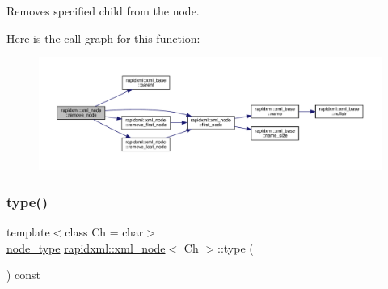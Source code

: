 Removes specified child from the node. 

Here is the call graph for this function\+:\nopagebreak
\begin{figure}[H]
\begin{center}
\leavevmode
\includegraphics[width=350pt]{classrapidxml_1_1xml__node_a98289923eb9e8889418a9eb0207ea35c_cgraph}
\end{center}
\end{figure}
\mbox{\label{classrapidxml_1_1xml__node_a5f91729128856b0aaab598d4364ace60}} 
\subsubsection{\texorpdfstring{type()}{type()}\hspace{0.1cm}{\footnotesize\ttfamily [1/2]}}
{\footnotesize\ttfamily template$<$class Ch = char$>$ \\
\mbox{\hyperlink{namespacerapidxml_abb456db38f7efb746c4330eed6072a7c}{node\+\_\+type}} \mbox{\hyperlink{classrapidxml_1_1xml__node}{rapidxml\+::xml\+\_\+node}}$<$ Ch $>$\+::type (\begin{DoxyParamCaption}{ }\end{DoxyParamCaption}) const\hspace{0.3cm}{\ttfamily [inline]}}

